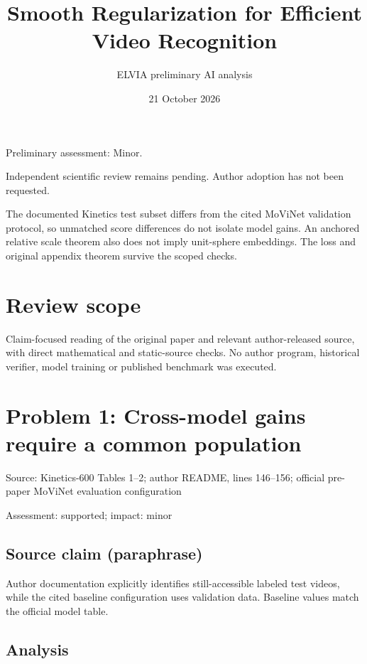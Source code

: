 \documentclass[11pt]{article}
\begin{document}
\title{Smooth Regularization for Efficient Video Recognition}

\author{ELVIA preliminary AI analysis}\date{21 October 2026}\maketitle

Preliminary assessment: Minor.\par

Independent scientific review remains pending. Author adoption has not been requested.

The documented Kinetics test subset differs from the cited MoViNet validation protocol, so unmatched score differences do not isolate model gains. An anchored relative scale theorem also does not imply unit-sphere embeddings. The loss and original appendix theorem survive the scoped checks.

\section*{Review scope}

Claim-focused reading of the original paper and relevant author-released source, with direct mathematical and static-source checks. No author program, historical verifier, model training or published benchmark was executed.

\section*{Problem 1: Cross-model gains require a common population}

Source: Kinetics-600 Tables 1–2; author README, lines 146–156; official pre-paper MoViNet evaluation configuration

Assessment: supported; impact: minor

\subsection*{Source claim (paraphrase)}

Author documentation explicitly identifies still-accessible labeled test videos, while the cited baseline configuration uses validation data. Baseline values match the official model table.

\subsection*{Analysis}
\end{document}

